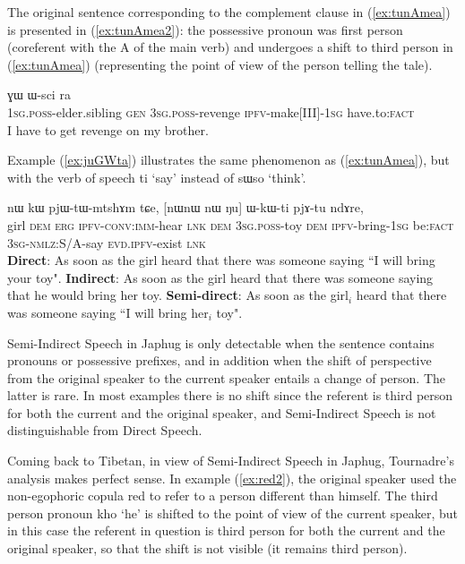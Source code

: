 \documentclass[oldfontcommands,oneside,a4paper,11pt]{article}
\newcommand{\ipa}[1]{{\phon \mbox{#1}}} %
\newcommand{\refb}[1]{(\ref{#1})}
\newcommand{\bleu}[1]{{\color{blue}#1}}
\newcommand{\rouge}[1]{{\color{red}#1}}
\begin{document}
The original sentence corresponding to the complement clause in \refb{ex:tunAmea} is presented in \refb{ex:tunAmea2}: the possessive pronoun was first person (coreferent with the A of the main verb) and undergoes a shift to third person in \refb{ex:tunAmea} (representing the point of view of the person telling the tale).
  \begin{exe}
\ex \label{ex:tunAmea2}
\gll \bleu{\ipa{a-pi}}  	\ipa{ɣɯ}  	\ipa{ɯ-sci}  	\bleu{\ipa{tu-nɤme-a}}  	\ipa{ra}	\\
 {\textsc{1sg.poss}-elder.sibling}  \textsc{gen} \textsc{3sg.poss}-revenge {\textsc{ipfv}-make[III]-\textsc{1sg}} have.to:\textsc{fact}  \\
\glt  I have to get revenge on my brother.
  \end{exe}
  
  Example \refb{ex:juGWta} illustrates the same phenomenon as \refb{ex:tunAmea}, but with the verb of speech \ipa{ti} `say' instead of \ipa{sɯso} `think'.
 
\begin{exe}
\ex \label{ex:juGWta}
\gll   \ipa{tɤɕime}  	\ipa{nɯ}  	\ipa{kɯ}  	\ipa{pjɯ-tɯ-mtshɤm}  	\ipa{tɕe,}  	[\ipa{nɯnɯ}  \rouge{\ipa{ɯ-kɯmtɕhɯ}}  	\ipa{nɯ}  	\bleu{\ipa{ju-ɣɯt-a}}  	\ipa{ŋu}]  		\ipa{ɯ-kɯ-ti}  	\ipa{pjɤ-tu}  	\ipa{ndɤre,}  \\
girl \textsc{dem} \textsc{erg} \textsc{ipfv-conv:imm}-hear \textsc{lnk} \textsc{dem} {\textsc{3sg.poss}-toy} \textsc{dem} {\textsc{ipfv}-bring-\textsc{1sg}}  be:\textsc{fact} \textsc{3sg-nmlz}:S/A-say \textsc{evd.ipfv}-exist \textsc{lnk} \\
\glt   \textbf{Direct}: As soon as the girl heard that there was someone saying ``\bleu{I will bring your toy}".
\glt   \textbf{Indirect}:  As soon as the girl heard that there was someone saying that \rouge{he would bring her toy}.
\glt   \textbf{Semi-direct}: As soon as the girl$_i$ heard that there was someone saying ``\bleu{I will bring} \rouge{her$_i$ toy}".
  \end{exe}
  
Semi-Indirect Speech in Japhug is only detectable when the sentence contains pronouns or possessive prefixes, and in addition when the shift of perspective from the original speaker to the current speaker entails a change of person. The latter is rare. In most examples there is no shift since the referent is third person for both the current and the original speaker, and Semi-Indirect Speech is not distinguishable from Direct Speech.

Coming back to Tibetan, in view of Semi-Indirect Speech in Japhug, Tournadre's analysis makes perfect sense. In example \refb{ex:red2}, the original speaker used the non-egophoric copula \ipa{red} to refer to a person different than himself. The third person pronoun \ipa{kho} `he' is shifted to the point of view of the current speaker, but in this case the referent in question is third person for both the current and the original speaker, so that the shift is not visible (it remains third person).
\end{document}
